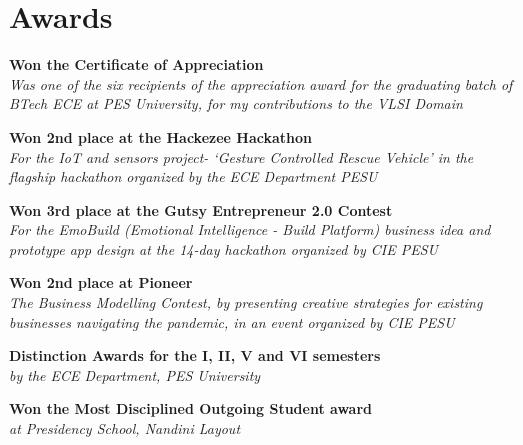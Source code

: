 \section{\sc Awards}


  {\bf{Won the Certificate of Appreciation}}  \\
\textit{Was one of the six recipients of the appreciation award for the graduating batch of BTech ECE at PES University, for my contributions to the VLSI Domain}  


  {\bf{Won 2nd place at the Hackezee Hackathon}} \\ 
\textit{For the IoT and sensors project- ‘Gesture Controlled Rescue Vehicle’ in the flagship hackathon organized by the ECE Department PESU} 

  {\bf{Won 3rd place at the Gutsy Entrepreneur 2.0 Contest}} \\
\textit{For the EmoBuild (Emotional Intelligence - Build Platform) business idea and prototype app design at the 14-day hackathon organized by CIE PESU} 


  {\bf{Won 2nd place at Pioneer}}  \\
\textit{The Business Modelling Contest, by presenting creative strategies for existing businesses navigating the pandemic, in an event organized by CIE PESU} 

  {\bf{Distinction Awards for the I, II, V and VI semesters}} \\
\textit{by the ECE Department, PES University} 


  {\bf{Won the Most Disciplined Outgoing Student award}}   \\
\textit{at Presidency School, Nandini Layout} 

\endinput
